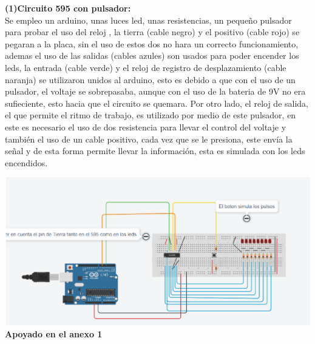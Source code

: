 \documentclass{article}
\begin{document}
\begin{justify}
\textbf{(1)Circuito 595 con pulsador:} \\
 Se empleo un arduino, unas luces led, unas resistencias, un pequeño pulsador para probar el uso del reloj , la tierra (cable negro) y el positivo (cable rojo) se pegaran a la placa, sin el uso de estos dos no hara un correcto funcionamiento, ademas el uso de las salidas (cables azules) son usados para poder encender los leds, la entrada (cable verde) y el reloj de registro de desplazamiento (cable naranja) se utilizaron unidos al arduino, esto es debido a que con el uso de un pulsador, el voltaje se sobrepasaba, aunque con el uso de la bateria de 9V no era sufieciente, esto hacia que el circuito se quemara. Por otro lado, el reloj de salida, el que permite el ritmo de trabajo, es utilizado por medio de este pulsador, en este es necesario el uso de dos resistencia para llevar el control del voltaje y también el uso de un cable positivo, cada vez que se le presiona, este envía la señal y de esta forma permite llevar la información, esta es simulada con los leds encendidos.
 \end{justify}

\includegraphics[scale=0.5]{figura2}
\centering
\textbf{Apoyado en el anexo 1}
\newline
\newline
\newline
\end{document}
